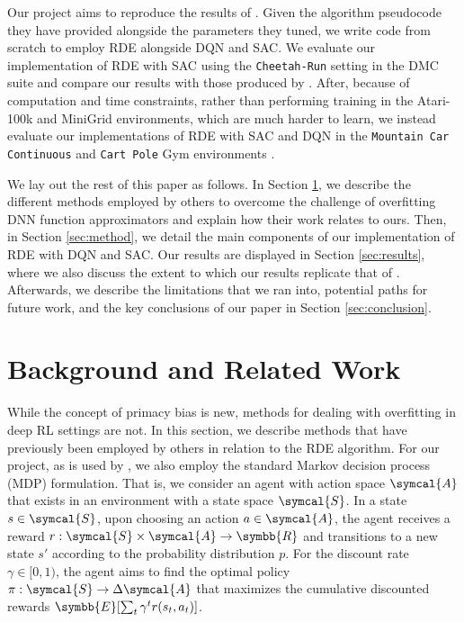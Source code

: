 \documentclass[base]{subfiles}
\begin{document}
Our project aims to reproduce the results of \cite{kim2023}. 
Given the algorithm pseudocode they have provided alongside the parameters they tuned, we write code from scratch to employ RDE alongside DQN and SAC. 
We evaluate our implementation of RDE with SAC using the \texttt{Cheetah-Run} setting in the DMC suite and compare our results with those produced by \cite{kim2023}.
After, because of computation and time constraints, rather than performing training in the Atari-100k and MiniGrid environments, which are much harder to learn, we instead evaluate our implementations of RDE with SAC and DQN in the \texttt{Mountain Car Continuous} and \texttt{Cart Pole} Gym environments \cite{gym}.

We lay out the rest of this paper as follows. 
In Section \ref{sec:related_work}, we describe the different methods employed by others to overcome the challenge of overfitting DNN function approximators and explain how their work relates to ours.
Then, in Section \ref{sec:method}, we detail the main components of our implementation of RDE with DQN and SAC.
Our results are displayed in Section \ref{sec:results}, where we also discuss the extent to which our results replicate that of \cite{kim2023}. 
Afterwards, we describe the limitations that we ran into, potential paths for future work, and the key conclusions of our paper in Section \ref{sec:conclusion}.

\section{Background and Related Work}
\label{sec:related_work}

While the concept of primacy bias is new, methods for dealing with overfitting in deep RL settings are not. In this section, we describe methods that have previously been employed by others in relation to the RDE algorithm. For our project, as is used by \cite{kim2023}, we also employ the standard Markov decision process (MDP) formulation. 
That is, we consider an agent with action space $\symcal{A}$ that exists in an environment with a state space $\symcal{S}$. 
In a state $s \in \symcal{S}$, upon choosing an action $a \in \symcal{A}$, the agent receives a reward $r: \symcal{S} \times \symcal{A} \rightarrow \symbb{R}$ and transitions to a new state $s'$ according to the probability distribution $p$. 
For the discount rate $\gamma \in [0,1)$, the agent aims to find the optimal policy $\pi: \symcal{S} \rightarrow \Delta \symcal{A}$ that maximizes the cumulative discounted rewards $\symbb{E} [ \sum_{t} \gamma^t r(s_t, a_t) ]$. 
\end{document}
